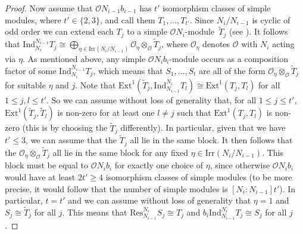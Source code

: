 \documentclass{amsart}
\theoremstyle{plain}\newtheorem{Theorem}{Theorem}[section]
\theoremstyle{plain}\newtheorem{Conjecture}[Theorem]{Conjecture}
\theoremstyle{plain}\newtheorem{Corollary}[Theorem]{Corollary}
\theoremstyle{plain}\newtheorem{Lemma}[Theorem]{Lemma}
\theoremstyle{plain}\newtheorem{Proposition}[Theorem]{Proposition}
\theoremstyle{definition}\newtheorem{Definition}[Theorem]{Definition}
\theoremstyle{definition}\newtheorem{Example}[Theorem]{Example}
\theoremstyle{definition}\newtheorem{Examples}[Theorem]{Examples}
\theoremstyle{definition}\newtheorem{Exercise}[Theorem]{Exercise}
\theoremstyle{definition}\newtheorem{Notation}[Theorem]{Notation}
\theoremstyle{definition}\newtheorem{Remark}[Theorem]{Remark}
\theoremstyle{definition}\newtheorem{Remarks}[Theorem]{Remarks}
\def\CO{{\mathcal{O}}}    \def\OPE{{\mathcal{O}(P\rtimes E)}}
\def\Ext{\mathrm{Ext}}        \def\tenkR{\otimes_{kR}}
\def\Ind{\mathrm{Ind}}    \def\tenC{\otimes_C}
\def\Irr{\mathrm{Irr}}           \def\tenK{\otimes_K}
\def\Res{\mathrm{Res}}           \def\tenOR{\otimes_{\mathcal{O}R}}
\numberwithin{equation}{section}
\begin{document}
\begin{proof}
Now assume that $\CO N_{i-1} b_{i-1}$ has $t'$ isomorphism classes of simple modules, where $t'\in\{2,3\}$, and call them $T_1, \ldots, T_{t'}$.
Since $N_i/N_{i-1}$ is cyclic of odd order we can extend each $T_j$ to a simple $\CO N_i$-module~$\tilde T_j$ (see \cite[Thm.~8.12]{N98}). It follows that $\Ind_{N_i}^{N_{i-1}} T_j \cong \bigoplus_{\eta \in \Irr(N_i/N_{i-1})} \CO_\eta \otimes _\CO \tilde T_j$, where $\CO_{\eta}$ denotes $\CO$ with $N_i$ acting via $\eta$. As mentioned above, any simple $\CO N_ib_i$-module occurs as a composition factor of some $\Ind_{N_i}^{N_{i-1}} T_j$, which means that $S_1,\ldots,S_t$ are all of the form $\CO_\eta \otimes _\CO \tilde T_j$ for suitable $\eta$ and $j$.  Note that $\Ext^1(\tilde T_j, \Ind_{N_{i-1}}^{N_i}T_l)\cong \Ext^1(T_j,T_l)$ for all $1\leq j,l\leq t'$. So we can assume without loss of generality that, for all $1\leq j \leq t'$, $\Ext^1(\tilde T_j, \tilde T_l)$ is non-zero for at least one $l\neq j$ such that $\Ext^1(T_j, T_l)$ is non-zero (this is by choosing the $\tilde T_j$ differently). In particular, given that we have $t'\leq 3$, we can assume that the $\tilde T_j$ all lie in the same block. It then follows that the $\CO_\eta \otimes_\CO \tilde T_j$ all lie in the same block for any fixed $\eta\in \Irr(N_i/N_{i-1})$. This block must be equal to $\CO N_i b_i$ for exactly one choice of $\eta$, since otherwise $\CO N_i b_i$ 
would have at least $2t'\geq 4$ isomorphism classes of simple modules (to be more precise, it would follow that the number of simple modules is $[N_i:N_{i-1}]t'$). In particular, $t=t'$ and we can  assume without loss of generality that $\eta=1$ and $S_j\cong \tilde T_j$ for all $j$. This means that $\Res^{N_i}_{N_{i-1}} S_j\cong T_j$ and $b_i\Ind_{N_{i-1}}^{N_i} T_j\cong S_j$ for all $j$. 
  

\end{proof}
\end{document}
